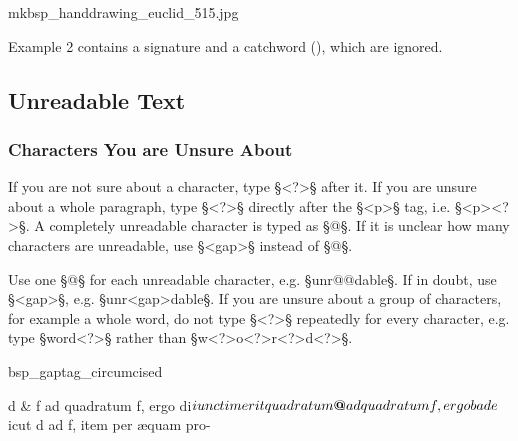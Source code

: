 \begin{sampleImage}{mkbsp_handdrawing_euclid_515.jpg}

\end{sampleImage}

\begin{crossref}
Example 2 contains a signature and a catchword (), which are ignored.
\end{crossref}


\tocspace
\subsection{Unreadable Text}
\label{section unreadable text}

\subsubsection{Characters You are Unsure About}
\label{section characters you are unsure about}

\begin{mainrule}
If you are not sure about a character, type §<?>§ after it. If you are unsure about a whole paragraph, type §<?>§ directly after the §<p>§ tag, i.e. §<p><?>§. A completely unreadable character is typed as §@§. If it is unclear how many characters are unreadable, use §<gap>§ instead of §@§.
\end{mainrule}

\begin{clarification}
Use one §@§ for each unreadable character, e.g. §unr@@dable§. If in doubt, use §<gap>§, e.g. §unr<gap>dable§. If you are unsure about a group of characters, for example a whole word, do not type §<?>§ repeatedly for every character, e.g. type §word<?>§ rather than §w<?>o<?>r<?>d<?>§.
\end{clarification}

\vspace{2mm}
\begin{sampleImage}[ 1: \, a stain]{bsp_gaptag_circumcised}
\begin{typeLatin}
 \someText
d & f ad quadratum f, ergo di$iunctim erit quadratum  ad\\
quadratum f, ergo b ad e $icut d ad f, item per æquam pro-\\
\someText {}
\end{typeLatin}

\end{sampleImage}

